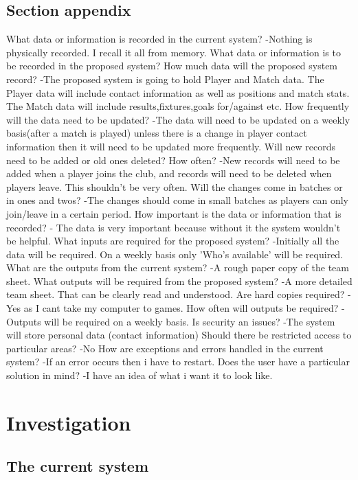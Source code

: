 \subsection{Section appendix}
What data or information is recorded in the current system?
-Nothing is physically recorded. I recall it all from memory.
What data or information is to be recorded in the proposed system? How much data will the proposed system record?
-The proposed system is going to hold Player and Match data. The Player data will include contact information as well as positions and match stats. The Match data will include results,fixtures,goals for/against etc.
How frequently will the data need to be updated?
-The data will need to be updated on a weekly basis(after a match is played) unless there is a change in player contact information then it will need to be updated more frequently. 
Will new records need to be added or old ones deleted? How often?
-New records will need to be added when a player joins the club, and records will need to be deleted when players leave. This shouldn't be very often.
Will the changes come in batches or in ones and twos?
-The changes should come in small batches as players can only join/leave in a certain period.
How important is the data or information that is recorded?
- The data is very important because without it the system wouldn't be helpful. 
What inputs are required for the proposed system?
-Initially all the data will be required. On a weekly basis only 'Who's available' will be required.
What are the outputs from the current system?
-A rough paper copy of the team sheet. 
What outputs will be required from the proposed system?
-A more detailed team sheet. That can be clearly read and understood.
Are hard copies required?
-Yes as I cant take my computer to games. 
How often will outputs be required?
-Outputs will be required on a weekly basis.
Is security an issues?
-The system will store personal data (contact information)
Should there be restricted access to particular areas?
-No
How are exceptions and errors handled in the current system?
-If an error occurs then i have to restart. 
Does the user have a particular solution in mind?
-I have an idea of what i want it to look like. 
\section{Investigation}

\subsection{The current system}

